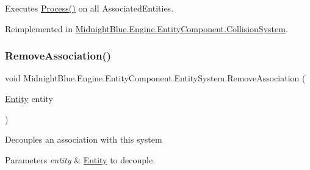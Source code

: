 Executes \hyperlink{class_midnight_blue_1_1_engine_1_1_entity_component_1_1_entity_system_a94aa715ac6bfe9a720c3d12d56c7598c}{Process()} on all Associated\+Entities. 



Reimplemented in \hyperlink{class_midnight_blue_1_1_engine_1_1_entity_component_1_1_collision_system_a31ce790a36d5948868df3fd352338194}{Midnight\+Blue.\+Engine.\+Entity\+Component.\+Collision\+System}.

\hypertarget{class_midnight_blue_1_1_engine_1_1_entity_component_1_1_entity_system_a961d5c483bf74d2ff40cf088d641a6ec}{}\label{class_midnight_blue_1_1_engine_1_1_entity_component_1_1_entity_system_a961d5c483bf74d2ff40cf088d641a6ec} 
\subsubsection{\texorpdfstring{Remove\+Association()}{RemoveAssociation()}}
{\footnotesize\ttfamily void Midnight\+Blue.\+Engine.\+Entity\+Component.\+Entity\+System.\+Remove\+Association (\begin{DoxyParamCaption}\item[{\hyperlink{class_midnight_blue_1_1_engine_1_1_entity_component_1_1_entity}{Entity}}]{entity }\end{DoxyParamCaption})\hspace{0.3cm}{\ttfamily [inline]}}



Decouples an association with this system 


\begin{DoxyParams}{Parameters}
{\em entity} & \hyperlink{class_midnight_blue_1_1_engine_1_1_entity_component_1_1_entity}{Entity} to decouple.\\
\hline
\end{DoxyParams}
\hypertarget{class_midnight_blue_1_1_engine_1_1_entity_component_1_1_entity_system_af884989f1949c20caac534892784375a}{}\label{class_midnight_blue_1_1_engine_1_1_entity_component_1_1_entity_system_af884989f1949c20caac534892784375a} 
